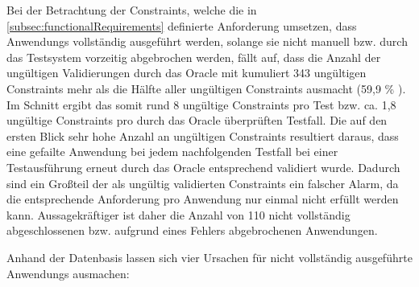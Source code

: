 Bei der Betrachtung der Constraints, welche die in \cref{subsec:functionalRequirements} definierte Anforderung umsetzen, dass \glspl{Anwendung} vollständig ausgeführt werden, solange sie nicht manuell bzw. durch das Testsystem vorzeitig abgebrochen werden, fällt auf, dass die Anzahl der ungültigen Validierungen durch das Oracle mit kumuliert 343 ungültigen Constraints mehr als die Hälfte aller ungültigen Constraints ausmacht (59,9 \% ).
Im Schnitt ergibt das somit rund 8 ungültige Constraints pro \gls{Test} bzw. ca. 1,8 ungültige Constraints pro durch das Oracle überprüften Testfall.
Die auf den ersten Blick sehr hohe Anzahl an ungültigen Constraints resultiert daraus, dass eine gefailte \gls{Anwendung} bei jedem nachfolgenden \gls{Testfall} bei einer Testausführung erneut durch das Oracle entsprechend validiert wurde.
Dadurch sind ein Großteil der als ungültig validierten Constraints ein falscher Alarm, da die entsprechende Anforderung pro \gls{Anwendung} nur einmal nicht erfüllt werden kann.
Aussagekräftiger ist daher die Anzahl von 110 nicht vollständig abgeschlossenen bzw. aufgrund eines Fehlers abgebrochenen Anwendungen.

Anhand der Datenbasis lassen sich vier Ursachen für nicht vollständig ausgeführte \glspl{Anwendung} ausmachen:

